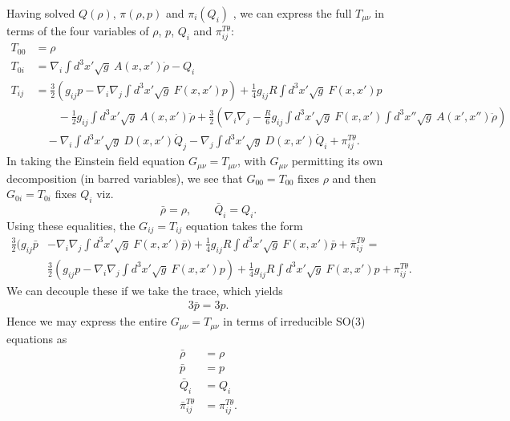 \documentclass[10pt,letterpaper]{article}
\numberwithin{equation}{subsection}
\begin{document}
Having solved $Q(\rho)$, $\pi(\rho,p)$ and $\pi_i(Q_i)$ , we can express the full $T_{\mu\nu}$ in terms of the four variables of $\rho$, $p$, $Q_i$ and $\pi_{ij}^{T\theta}$:
\begin{align}
T_{00} &= \rho
\nonumber\\
T_{0i} &= \nabla_i \int d^3x' \sqrt g\ A(x,x') \dot \rho - Q_i
\nonumber\\
T_{ij}&=   \frac32 \left( g_{ij} p - \nabla_i \nabla_j \int d^3x' \sqrt g\ F(x,x') p\right) + \frac{1}{4} g_{ij} R \int d^3x' \sqrt g\ F(x,x') p
\nonumber\\
&\qquad -\frac12 g_{ij} \int d^3x' \sqrt g\ A(x,x') \ddot \rho + \frac32 \left( \nabla_i \nabla_j - \frac{R}{6} g_{ij} 
\int d^3x' \sqrt g\ F(x,x') \int d^3x'' \sqrt g\ A(x',x'') \ddot\rho \right)
\nonumber\\
&\quad - \nabla_i  \int d^3x' \sqrt g\ D(x,x') \dot Q_j - \nabla_j  \int d^3x' \sqrt g\ D(x,x') \dot Q_i + \pi_{ij}^{T\theta}.
\end{align}
In taking the Einstein field equation $G_{\mu\nu} = T_{\mu\nu}$, with $G_{\mu\nu}$ permitting its own decomposition (in barred variables), we see that
$G_{00} = T_{00}$ fixes $\rho$ and then $G_{0i} = T_{0i}$ fixes $Q_i$ viz.
\begin{equation}
\bar \rho = \rho,\qquad \bar Q_i = Q_i.
\end{equation}
Using these equalities, the $G_{ij} = T_{ij}$ equation takes the form
\begin{align}
 \frac32  \bigg( g_{ij} \bar p &- \nabla_i \nabla_j \int d^3x' \sqrt g\ F(x,x') \bar p\bigg)  + \frac{1}{4} g_{ij} R \int d^3x' \sqrt g\ F(x,x') \bar p + \bar \pi_{ij}^{T\theta} =
\nonumber\\
& \frac32    \left( g_{ij} p - \nabla_i \nabla_j \int d^3x' \sqrt g\ F(x,x') p \right)    + \frac{1}{4} g_{ij} R \int d^3x' \sqrt g\ F(x,x') p + \pi_{ij}^{T\theta}.
\end{align}
We can decouple these if we take the trace, which yields
\begin{align}
3\bar p = 3p.
\end{align}
Hence we may express the entire $G_{\mu\nu} = T_{\mu\nu}$ in terms of irreducible SO(3) equations as
\begin{align}
\bar \rho &= \rho
\nonumber\\
\bar p &= p
\nonumber\\
\bar Q_i & = Q_i
\nonumber\\
\bar\pi_{ij}^{T\theta} &= \pi_{ij}^{T\theta}.
\end{align}
\end{document}
